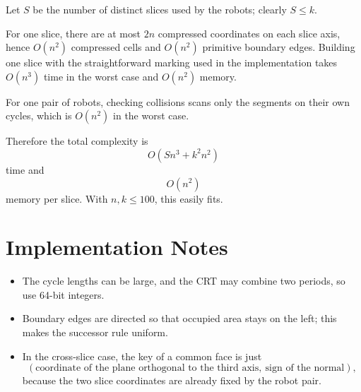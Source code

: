 \documentclass[11pt]{article}
\begin{document}
Let $S$ be the number of distinct slices used by the robots; clearly $S \le k$.

For one slice, there are at most $2n$ compressed coordinates on each slice axis, hence $O(n^2)$ compressed cells and
$O(n^2)$ primitive boundary edges.
Building one slice with the straightforward marking used in the implementation takes $O(n^3)$ time in the worst case
and $O(n^2)$ memory.

For one pair of robots, checking collisions scans only the segments on their own cycles, which is $O(n^2)$ in the worst
case.

Therefore the total complexity is
\[
    O(Sn^3 + k^2 n^2)
\]
time and
\[
    O(n^2)
\]
memory per slice.
With $n,k \le 100$, this easily fits.

\section*{Implementation Notes}

\begin{itemize}[leftmargin=*]
    \item The cycle lengths can be large, and the CRT may combine two periods, so use 64-bit integers.
    \item Boundary edges are directed so that occupied area stays on the left; this makes the successor rule uniform.
    \item In the cross-slice case, the key of a common face is just
    \[
        (\text{coordinate of the plane orthogonal to the third axis},\ \text{sign of the normal}),
    \]
    because the two slice coordinates are already fixed by the robot pair.
\end{itemize}
\end{document}
